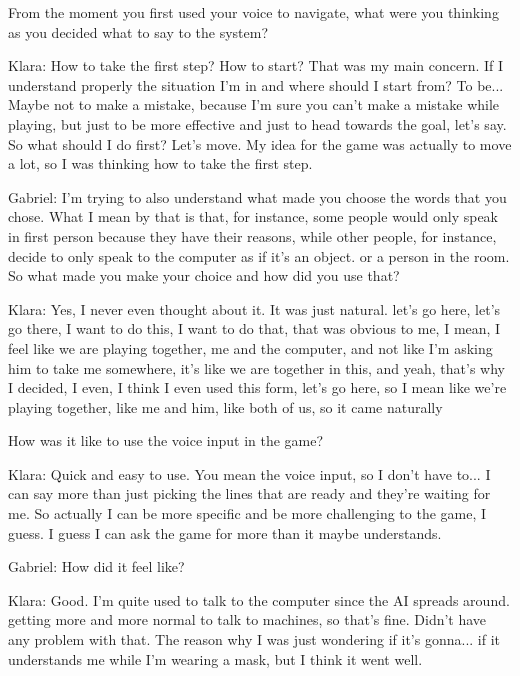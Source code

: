 \begin{QandA}


   \item From the moment you first used your voice to navigate, what were you thinking as you decided what to say to the system?

         \begin{answered}
            Klara: How to take the first step?
             How to start?
            That was my main concern.
            If I understand properly the situation I'm in and where should I start from?
            To be... Maybe not to make a mistake, because I'm sure you can't make a mistake while playing, but just to be more effective and just to head towards the goal, let's say.
            So what should I do first?
            Let's move.
            My idea for the game was actually to move a lot, so I was thinking how to take the first step.


            Gabriel: I'm trying to also understand what made you choose the words that you chose.
            What I mean by that is that, for instance, some people would only speak in first person because they have their reasons, while other people, for instance, decide to only speak to the computer as if it's an object. or a person in the room.
            So what made you make your choice and how did you use that?


            Klara: Yes, I never even thought about it.
            It was just natural.
            let's go here, let's go there, I want to do this, I want to do that, that was obvious to me, I mean, I feel like we are playing together, me and the computer, and not like I'm asking him to take me somewhere, it's like we are together in this, and yeah, that's why I decided, I even, I think I even used this form, let's go here, so I mean like we're playing together, like me and him, like both of us, so it came naturally
         \end{answered}

    \item How was it like to use the voice input in the game?
         \begin{answered}
            Klara: Quick and easy to use.
            You mean the voice input, so I don't have to...
            I can say more than just picking the lines that are ready and they're waiting for me.
            So actually I can be more specific and be more challenging to the game, I guess.
            I guess I can ask the game for more than it maybe understands.


            Gabriel: How did it feel like?


            Klara: Good.
            I'm quite used to talk to the computer since the AI spreads around.
            getting more and more normal to talk to machines, so that's fine.
            Didn't have any problem with that.
            The reason why I was just wondering if it's gonna... if it understands me while I'm wearing a mask, but I think it went well.
         \end{answered}


\end{QandA}





